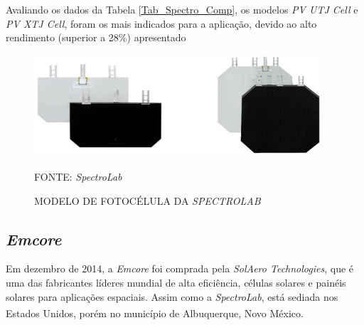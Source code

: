 \documentclass[
	12pt,				%
	openright,			%
	oneside,			%
	a4paper,			%
	english,			%
	french,				%
	spanish,			%
	brazil,				%
	oldfontcommands
	]{abntex2}
\begin{document}
	Avaliando os dados da Tabela \ref{Tab_Spectro_Comp}, os modelos \textit{PV UTJ Cell} e \textit{PV XTJ Cell}, foram os mais indicados para a aplicação, devido ao alto rendimento (superior a 28\%) apresentado
	
	\begin{figure}[th]
		\caption{MODELO DE FOTOCÉLULA DA \textit{SPECTROLAB}}
		\label{Fig_Cell_Spectro}
		\centering
		\includegraphics[width=1.0\linewidth]{./figs/UTJ}
			
		\begin{small}
			FONTE: \textit{SpectroLab}\textsuperscript{\cite{SpectroLab2}}
		\end{small}		
	\end{figure}

\subsection[Emcore]{\textit{Emcore}}

	Em dezembro de 2014, a \textit{Emcore} foi comprada pela \textit{SolAero Technologies}, que é uma das fabricantes líderes mundial de alta eficiência, células solares e painéis solares para aplicações espaciais. Assim como a \textit{SpectroLab}, está sediada nos Estados Unidos, porém no município de Albuquerque, Novo México.\textsuperscript{\cite{Emcore}}\textsuperscript{\cite{Emcore2}}
	
\end{document}
